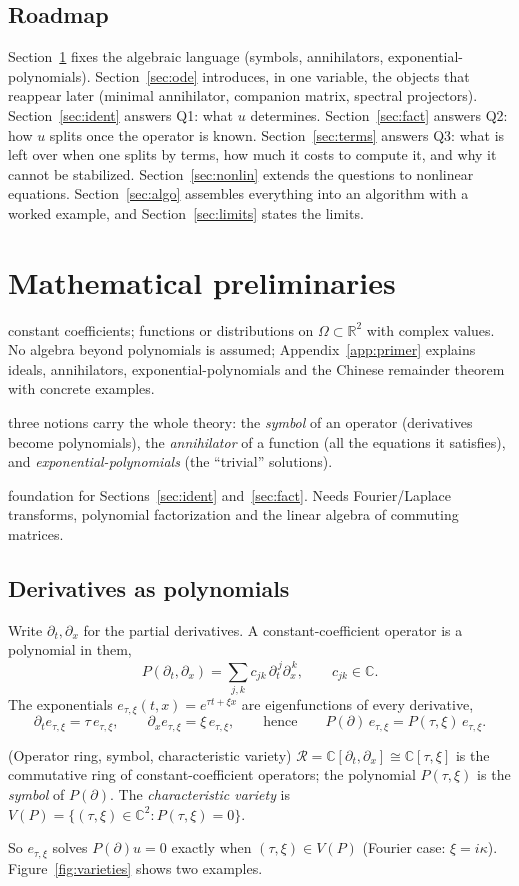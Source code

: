 \documentclass[11pt,a4paper]{article}
\theoremstyle{definition}
\newcommand{\sectionbrief}[3]{\begin{leadin}\begin{description}[nosep,leftmargin=3.0cm,labelwidth=2.8cm]
  \item[Starting from] #1
  \item[Why this section] #2
  \item[Role in the paper] #3
  \end{description}\end{leadin}}
\newcommand{\R}{\mathbb{R}}\newcommand{\C}{\mathbb{C}}\newcommand{\N}{\mathbb{N}}\newcommand{\Z}{\mathbb{Z}}
\newcommand{\ring}{\mathcal{R}}
\newcommand{\Var}{V}
\begin{document}
\subsection{Roadmap}
Section~\ref{sec:prelim} fixes the algebraic language (symbols, annihilators, exponential-polynomials). Section~\ref{sec:ode} introduces, in one variable, the objects that reappear later (minimal annihilator, companion matrix, spectral projectors). Section~\ref{sec:ident} answers Q1: what $u$ determines. Section~\ref{sec:fact} answers Q2: how $u$ splits once the operator is known. Section~\ref{sec:terms} answers Q3: what is left over when one splits by terms, how much it costs to compute it, and why it cannot be stabilized. Section~\ref{sec:nonlin} extends the questions to nonlinear equations. Section~\ref{sec:algo} assembles everything into an algorithm with a worked example, and Section~\ref{sec:limits} states the limits.

\section{Mathematical preliminaries}\label{sec:prelim}
\sectionbrief
{constant coefficients; functions or distributions on $\Omega\subset\R^2$ with complex values. No algebra beyond polynomials is assumed; Appendix~\ref{app:primer} explains ideals, annihilators, exponential-polynomials and the Chinese remainder theorem with concrete examples.}
{three notions carry the whole theory: the \emph{symbol} of an operator (derivatives become polynomials), the \emph{annihilator} of a function (all the equations it satisfies), and \emph{exponential-polynomials} (the ``trivial'' solutions).}
{foundation for Sections~\ref{sec:ident} and~\ref{sec:fact}. Needs Fourier/Laplace transforms, polynomial factorization and the linear algebra of commuting matrices.}

\subsection{Derivatives as polynomials}
Write $\partial_t,\partial_x$ for the partial derivatives. A constant-coefficient operator is a polynomial in them,
\[
P(\partial_t,\partial_x)=\sum_{j,k}c_{jk}\,\partial_t^{\,j}\partial_x^{\,k},\qquad c_{jk}\in\C .
\]
The exponentials $e_{\tau,\xi}(t,x)=e^{\tau t+\xi x}$ are eigenfunctions of every derivative,
\[
\partial_te_{\tau,\xi}=\tau\,e_{\tau,\xi},\qquad \partial_xe_{\tau,\xi}=\xi\,e_{\tau,\xi},
\qquad\text{hence}\qquad P(\partial)\,e_{\tau,\xi}=P(\tau,\xi)\,e_{\tau,\xi}.
\]
\begin{definition}{(Operator ring, symbol, characteristic variety)}\label{def:ring}
$\ring=\C[\partial_t,\partial_x]\cong\C[\tau,\xi]$ is the commutative ring of constant-coefficient operators; the polynomial $P(\tau,\xi)$ is the \emph{symbol} of $P(\partial)$. The \emph{characteristic variety} is $\Var(P)=\{(\tau,\xi)\in\C^2:P(\tau,\xi)=0\}$.
\end{definition}
So $e_{\tau,\xi}$ solves $P(\partial)u=0$ exactly when $(\tau,\xi)\in\Var(P)$ (Fourier case: $\xi=i\kappa$). Figure~\ref{fig:varieties} shows two examples.
\end{document}
